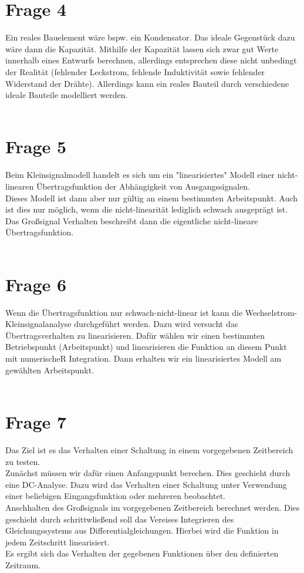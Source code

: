 \documentclass[a4paper]{scrartcl}
\begin{document}
\section*{Frage 4}
Ein reales Bauelement wäre bspw. ein Kondensator. Das ideale Gegenstück dazu wäre dann die Kapazität. Mithilfe der Kapazität lassen sich zwar gut Werte innerhalb eines Entwurfs berechnen, allerdings entsprechen diese nicht unbedingt der Realität (fehlender Leckstrom, fehlende Induktivität sowie fehlender Widerstand der Drähte). Allerdings kann ein reales Bauteil durch verschiedene ideale Bauteile modelliert werden.
~\\
~\\



\section*{Frage 5}
Beim Kleinsignalmodell handelt es sich um ein "linearisiertes" Modell einer nicht-linearen Übertragsfunktion der Abhängigkeit von Ausgangssignalen.\\
Dieses Modell ist dann aber nur gültig an einem bestimmten Arbeitspunkt. Auch ist dies nur möglich, wenn die nicht-linearität lediglich schwach ausgeprägt ist.\\
Das Großsignal Verhalten beschreibt dann die eigentliche nicht-lineare Übertragsfunktion.
~\\
~\\

\section*{Frage 6}
Wenn die Übertragsfunktion nur schwach-nicht-linear ist kann die Wechselstrom-Kleinsignalanalyse durchgeführt werden. Dazu wird versucht das Übertragsverhalten zu linearisieren. Dafür wählen wir einen bestimmten Betriebspunkt (Arbeitspunkt) und linearisieren die Funktion an diesem Punkt mit numerischeR Integration. Dann erhalten wir ein linearisiertes Modell am gewählten Arbeitspunkt.
~\\
~\\



\section*{Frage 7}
Das Ziel ist es das Verhalten einer Schaltung in einem vorgegebenen Zeitbereich zu testen.\\
Zunächst müssen wir dafür einen Anfangspunkt berechen. Dies geschieht durch eine DC-Analyse. Dazu wird das Verhalten einer Schaltung unter Verwendung einer beliebigen Eingangsfunktion oder mehreren beobachtet.\\
Anschhalten des Großsignals im vorgegebenen Zeitbereich berechnet werden. Dies geschieht durch schrittwließend soll das Vereises Integrieren des Gleichungssystems aus Differentialgleichungen.
Hierbei wird die Funktion in jedem Zeitschritt linearisiert.\\
Es ergibt sich das Verhalten der gegebenen Funktionen über den definierten Zeitraum.
~\\
~\\
\end{document}
